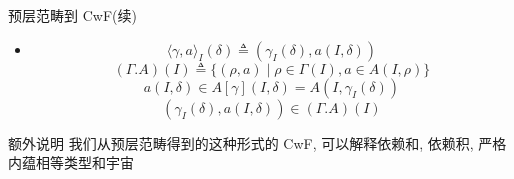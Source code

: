 \documentclass[aspectratio=169,xcolor=dvipsnames]{beamer}
\begin{document}
\begin{frame}[shrink]{预层范畴到 CwF(续)}
\begin{itemize}
  \item \phantom{ }
  \[ \langle\gamma,a\rangle_I(\delta) \triangleq (\gamma_I(\delta),a(I,\delta)) \]
  \[ (\Gamma.A)(I) \triangleq \{ (\rho,a) \mid \rho \in \Gamma(I), a \in A(I,\rho) \} \]
  \[ a(I,\delta) \in A[\gamma](I,\delta) = A(I,\gamma_I(\delta)) \]
  \[ (\gamma_I(\delta),a(I,\delta)) \in (\Gamma.A)(I) \]
\end{itemize}
\end{frame}

\begin{frame}{额外说明}
  我们从预层范畴得到的这种形式的 CwF, 可以解释依赖和, 依赖积, 严格内蕴相等类型和宇宙
\end{frame}
\end{document}
